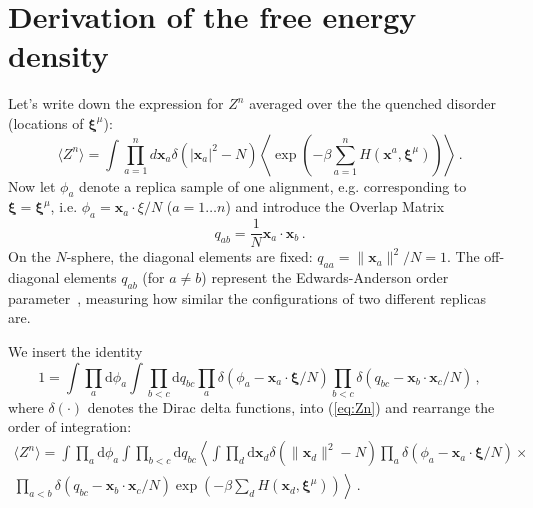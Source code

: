 \documentclass{article}
\newcommand{\dd}{{\mathrm{d}}}
\theoremstyle{plain}
\theoremstyle{definition}
\theoremstyle{remark}
\begin{document}
\nocite{langley00}




\newpage
\appendix
\onecolumn
\section{Derivation of the free energy density}

Let's write down the expression for $Z^n$ averaged over the the quenched disorder (locations of $\bm{\xi}^\mu$):
\begin{equation}
    \langle Z^n \rangle = \int \prod_{a=1}^n d\bm{x}_a \delta(|\bm{x}_a|^2 - N) \left\langle \exp\left(-\beta \sum_{a=1}^n H(\bm{x}^a, \bm{\xi}^\mu)\right) \right\rangle\,.
    \label{eq:Zn}
\end{equation}
Now let $\phi_a$ denote a replica sample of one alignment, e.g. corresponding to $\bm{\xi} = \bm{\xi}^\mu$, i.e. $\phi_a = \bm{x}_a \cdot \xi /N$ ($a=1\dots n$) and introduce the Overlap Matrix 
\begin{equation}
    q_{ab} = \frac{1}{N} \bm{x}_a \cdot \bm{x}_b\,.
\end{equation}
On the $N$-sphere, the diagonal elements are fixed: $q_{aa} =  \|\bm{x}_a\|^2/N = 1$. The off-diagonal elements $q_{ab}$ (for $a \neq b$) represent the Edwards-Anderson order parameter~\cite{ea75}, measuring how similar the configurations of two different replicas are.

We insert the identity 
\begin{equation}
1 = \int \prod_a \dd \phi_a \int \prod_{b<c} \dd q_{bc} \prod_a \delta\left(\phi_a - \bm{x}_a \cdot \bm{\xi}/N\right) \prod_{b<c} \delta\left(q_{bc} - \bm{x}_b \cdot \bm{x}_c/N\right)\,,
\end{equation}
where $\delta(\cdot)$ denotes the Dirac delta functions, into (\ref{eq:Zn}) and rearrange the order of integration:
\begin{multline}
\langle Z^n \rangle = \int \prod_a \dd \phi_a \int \prod_{b<c}  \dd q_{bc} \left\langle \int \prod_d \dd \bm{x}_d \delta(\|\bm{x}_d\|^2 - N) \prod_a \delta(\phi_a - \bm{x}_a \cdot \bm{\xi}/N) \right. \times \\
\left. \prod_{a<b} \delta(q_{bc} - \bm{x}_b \cdot \bm{x}_c/N) \exp\left(-\beta \sum_d H(\bm{x}_d, \bm{\xi}^\mu)\right) \right\rangle \,.
\end{multline}
\end{document}
